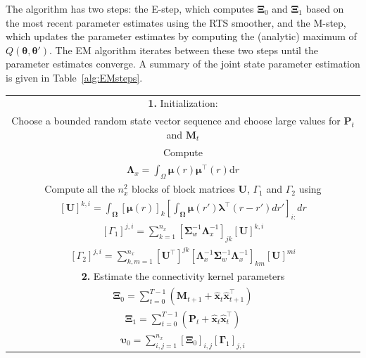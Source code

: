 \documentclass[review,authoryear,3p]{elsarticle}
\begin{document}
The algorithm has two steps: the E-step, which computes $\boldsymbol\Xi_0$ and $\boldsymbol\Xi_1$ based on the most recent parameter estimates using the RTS smoother, and the M-step, which updates the parameter estimates by computing the (analytic) maximum of $Q(\boldsymbol\theta,\boldsymbol\theta')$. The EM algorithm iterates between these two steps until the parameter estimates converge. A summary of the joint state parameter estimation is given in Table~\ref{alg:EMsteps}.
\renewcommand{\arraystretch}{1.7}
\begin{table}[!ht]
\begin{tabular}{|c|}\hline
\multicolumn{1}{|p{16cm}|}{\textbf{1.} Initialization:  } \\ 
\multicolumn{1}{|p{16cm}|}{Choose a bounded random state vector sequence and choose large values for $\mathbf P_t$ and $\mathbf M_t$} \\
\multicolumn{1}{|p{16cm}|}{Compute} \\
$\mathbf{\Lambda}_{x}=\int_{\Omega}\boldsymbol{\mu}\left(r\right)\boldsymbol{\mu}^\top\left(r\right) \mathrm{d}r$\\
\multicolumn{1}{|p{16cm}|}{Compute all the $n^2_x$ blocks of block matrices $\mathbf U$, $\Gamma_1$ and  $\Gamma_2$ using} \\
$\left[ \mathbf U\right] ^{k,i}=\int_{\boldsymbol \Omega}\left[\boldsymbol\mu(r) \right]_k \left[\int_{\boldsymbol\Omega} \boldsymbol\mu\left(r'\right)\boldsymbol \lambda^\top \left(r-r'\right) dr'\right]_{i:} dr$\\
$\left[ \Gamma_1\right]^{j,i} =\sum_{k=1}^{n_x}\left[ \boldsymbol\Sigma_w^{-1}\boldsymbol\Lambda_x^{-1}\right]_{jk} \left[ \mathbf U\right]^{k,i}$\\
$\left[ \Gamma_2\right] ^{j,i}=\sum_{k,m=1}^{n_x}[\mathbf U^{\top}]^{jk} \left[\boldsymbol\Lambda_x^{-1}\boldsymbol\Sigma_w^{-1}\boldsymbol\Lambda_x^{-1} \right]_{km}[\mathbf U]^{mi}$\\
\hline
\multicolumn{1}{|p{16cm}|}{\textbf{2.} Estimate the connectivity kernel parameters} \\
$\boldsymbol\Xi_0=\sum_{t=0}^{T-1}\left(\mathbf M_{t+1}+\mathbf{\hat x}_t\mathbf{\hat x}_{t+1}^\top\right)$\\
$\boldsymbol\Xi_1=\sum_{t=0}^{T-1}\left(\mathbf P_t+\mathbf{\hat x}_t\mathbf{\hat x}_t^\top\right)$\\
$\boldsymbol\upsilon_0=\sum_{i,j=1}^{n_x}[\boldsymbol\Xi_0]_{i,j}[\boldsymbol\Gamma_1]_{j,i}$\\

\end{tabular}
\end{table}
\end{document}

